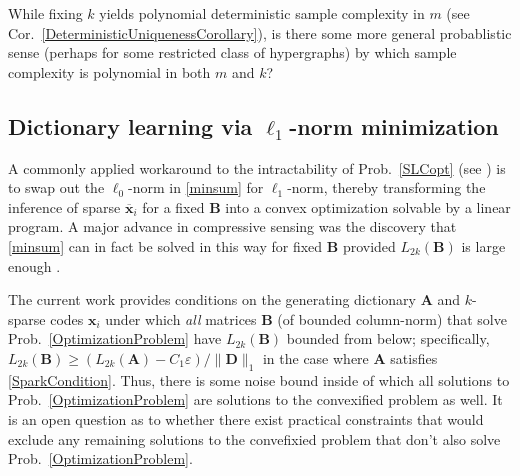 \begin{question}
While fixing $k$ yields polynomial deterministic sample complexity in $m$ (see Cor.~\ref{DeterministicUniquenessCorollary}), is there some more general probablistic sense (perhaps for some restricted class of hypergraphs) by which sample complexity is polynomial in both $m$ and $k$?
\end{question}



\subsection{Dictionary learning via $\ell_1$-norm minimization}

A commonly applied workaround to the intractability of Prob.~\ref{SLCopt} (see \cite{tillmann2015computational}) is to swap out the $\ell_0$-norm in \eqref{minsum} for $\ell_1$-norm, thereby transforming the inference of sparse $\mathbf{\overline x}_i$ for a fixed $\mathbf{B}$ into a convex optimization solvable by a linear program. A major advance in compressive sensing was the discovery that \eqref{minsum} can in fact be solved in this way for fixed $\mathbf{B}$ provided $L_{2k}(\mathbf{B})$ is large enough \cite{eldar2012compressed}. 

The current work provides conditions on the generating dictionary $\mathbf{A}$ and $k$-sparse codes $\mathbf{x}_i$ under which \emph{all} matrices $\mathbf{B}$ (of bounded column-norm) that solve Prob.~\ref{OptimizationProblem} have $L_{2k}(\mathbf{B})$ bounded from below; specifically, $L_{2k}(\mathbf{B}) \geq \left(L_{2k}(\mathbf{A}) - C_1\varepsilon \right) / \|\mathbf{D}\|_1$ in the case where $\mathbf{A}$ satisfies \eqref{SparkCondition}. Thus, there is some noise bound inside of which all solutions to Prob.~\ref{OptimizationProblem} are solutions to the convexified problem as well. It is an open question as to whether there exist practical constraints that would exclude any remaining solutions to the convefixied problem that don't also solve Prob.~\ref{OptimizationProblem}. 

